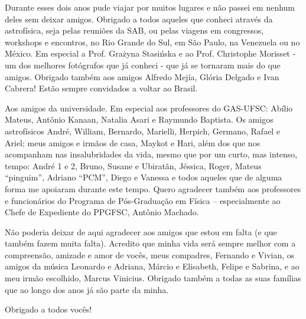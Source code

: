 Durante esses dois anos pude viajar por muitos lugares e não passei em nenhum deles sem deixar amigos. Obrigado a todos
aqueles que conheci através da astrofísica, seja pelas reuniões da SAB, ou pelas viagens em congressos, workshops
e encontros, no Rio Grande do Sul, em São Paulo, na Venezuela ou no México. Em especial a Prof. Gra\.zyna Stasi\'nska e ao
Prof. Christophe Morisset - um dos melhores fotógrafos que já conheci - que já se tornaram mais do que amigos. Obrigado
também aos amigos Alfredo Mejía, Glória Delgado e Ivan Cabrera! Estão sempre convidados a voltar ao Brasil.

Aos amigos da universidade. Em especial aos professores do GAS-UFSC: Abílio Mateus, Antônio Kanaan, Natalia Asari e
Raymundo Baptista. Os amigos astrofísicos André, William, Bernardo, Marielli, Herpich, Germano, Rafael e Ariel; meus
amigos e irmãos de casa, Maykot e Hari, além dos que nos acompanham nas insalubridades da vida, mesmo que por um
curto, mas intenso, tempo: André 1 e 2, Bruno, Susane e Ubiratãn, Jéssica, Roger, Mateus ``pinguim'', Adriano ``PCM'',
Diego e Vanessa e todos aqueles que de alguma forma me apoiaram durante este tempo. Quero agradecer também aos
professores e funcionários do Programa de Pós-Graduação em Física – especialmente ao Chefe de Expediente do PPGFSC,
Antônio Machado.

Não poderia deixar de aqui agradecer aos amigos que estou em falta (e que também fazem muita falta). Acredito que minha
vida será sempre melhor com a compreensão, amizade e amor de vocês, meus compadres, Fernando e Vivian, os amigos da
música Leonardo e Adriana, Márcio e Elisabeth, Felipe e Sabrina, e ao meu irmão escolhido, Marcus Vinicius. Obrigado
também a todas as suas famílias que ao longo dos anos já são parte da minha.

Obrigado a todos vocês!

